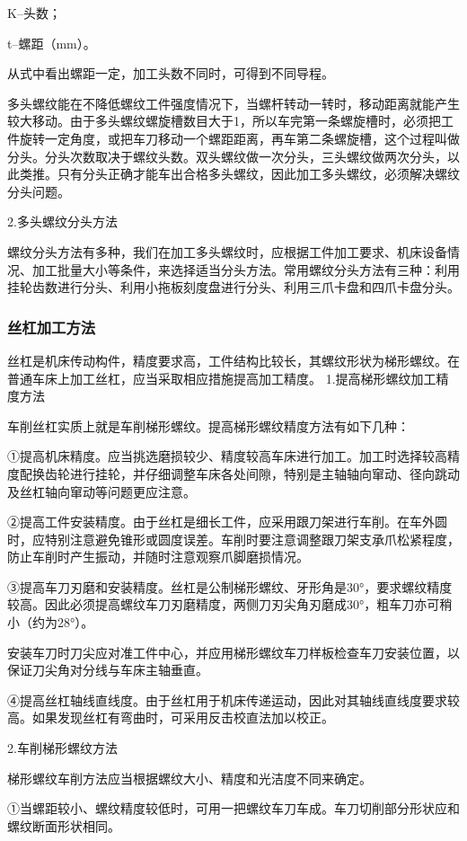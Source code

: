 \documentclass{ctexbook}
\begin{document}
K--头数；

t--螺距（mm）。

从式中看出螺距一定，加工头数不同时，可得到不同导程。

多头螺纹能在不降低螺纹工件强度情况下，当螺杆转动一转时，移动距离就能产生较大移动。由于多头螺纹螺旋槽数目大于1，所以车完第一条螺旋槽时，必须把工件旋转一定角度，或把车刀移动一个螺距距离，再车第二条螺旋槽，这个过程叫做分头。分头次数取决于螺纹头数。双头螺纹做一次分头，三头螺纹做两次分头，以此类推。只有分头正确才能车出合格多头螺纹，因此加工多头螺纹，必须解决螺纹分头问题。

2.多头螺纹分头方法

螺纹分头方法有多种，我们在加工多头螺纹时，应根据工件加工要求、机床设备情况、加工批量大小等条件，来选择适当分头方法。常用螺纹分头方法有三种：利用挂轮齿数进行分头、利用小拖板刻度盘进行分头、利用三爪卡盘和四爪卡盘分头。
\subsubsection{丝杠加工方法}
丝杠是机床传动构件，精度要求高，工件结构比较长，其螺纹形状为梯形螺纹。在普通车床上加工丝杠，应当采取相应措施提高加工精度。
1.提高梯形螺纹加工精度方法

车削丝杠实质上就是车削梯形螺纹。提高梯形螺纹精度方法有如下几种：

①提高机床精度。应当挑选磨损较少、精度较高车床进行加工。加工时选择较高精度配换齿轮进行挂轮，并仔细调整车床各处间隙，特别是主轴轴向窜动、径向跳动及丝杠轴向窜动等问题更应注意。	

②提高工件安装精度。由于丝杠是细长工件，应采用跟刀架进行车削。在车外圆时，应特别注意避免锥形或圆度误差。车削时要注意调整跟刀架支承爪松紧程度，防止车削时产生振动，并随时注意观察爪脚磨损情况。

③提高车刀刃磨和安装精度。丝杠是公制梯形螺纹、牙形角是30°，要求螺纹精度较高。因此必须提高螺纹车刀刃磨精度，两侧刀刃尖角刃磨成30°，粗车刀亦可稍小（约为28°）。

安装车刀时刀尖应对准工件中心，并应用梯形螺纹车刀样板检查车刀安装位置，以保证刀尖角对分线与车床主轴垂直。

④提高丝杠轴线直线度。由于丝杠用于机床传递运动，因此对其轴线直线度要求较高。如果发现丝杠有弯曲时，可采用反击校直法加以校正。

2.车削梯形螺纹方法

梯形螺纹车削方法应当根据螺纹大小、精度和光洁度不同来确定。

①当螺距较小、螺纹精度较低时，可用一把螺纹车刀车成。车刀切削部分形状应和螺纹断面形状相同。
\end{document}
